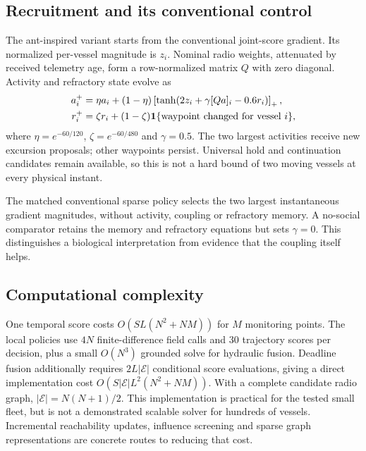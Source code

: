 \subsection{Recruitment and its conventional control}
The ant-inspired variant starts from the conventional joint-score gradient.
Its normalized per-vessel magnitude is $z_i$. Nominal radio weights, attenuated
by received telemetry age, form a row-normalized matrix $Q$ with zero diagonal.
Activity and refractory state evolve as
\begin{align}
 a_i^+={}&\eta a_i+(1-\eta)
  \left[\tanh(2z_i+\gamma[Qa]_i-0.6r_i)\right]_+,\\
 r_i^+={}&\zeta r_i+(1-\zeta)
                 \mathbf 1\{\text{waypoint changed for vessel }i\},
\end{align}
where $\eta=e^{-60/120}$, $\zeta=e^{-60/480}$ and $\gamma=0.5$.
The two largest activities receive new excursion proposals; other waypoints
persist. Universal hold and continuation candidates remain available, so this
is not a hard bound of two moving vessels at every physical instant.

The matched conventional sparse policy selects the two largest instantaneous
gradient magnitudes, without activity, coupling or refractory memory. A
no-social comparator retains the memory and refractory equations but sets
$\gamma=0$. This distinguishes a biological interpretation from evidence that
the coupling itself helps.

\subsection{Computational complexity}
One temporal score costs
$O(SL(N^2+NM))$ for $M$ monitoring points.
The local policies use $4N$ finite-difference field calls and 30 trajectory
scores per decision, plus a small $O(N^3)$ grounded solve for hydraulic fusion.
Deadline fusion additionally requires $2L|\mathcal E|$ conditional score
evaluations, giving a direct implementation cost
$O(S|\mathcal E|L^2(N^2+NM))$. With a complete candidate radio graph,
$|\mathcal E|=N(N+1)/2$. This implementation is practical for the tested small
fleet, but is not a demonstrated scalable solver for hundreds of vessels.
Incremental reachability updates, influence screening and sparse graph
representations are concrete routes to reducing that cost.
